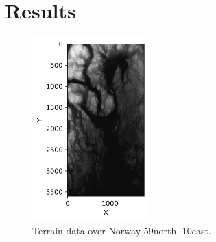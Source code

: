 \documentclass[../main.tex]{subfiles}
\begin{document}
\section{Results}\label{sec:results}


\begin{figure}[htb] 
   \centering
   \includegraphics[width=0.4\textwidth]{../assets/terrain_n59_e010.png} 
   \caption{Terrain data over Norway 59\degree north, 10\degree east.}
   \label{fig:terrain_Norway}
\end{figure} 
\end{document}
